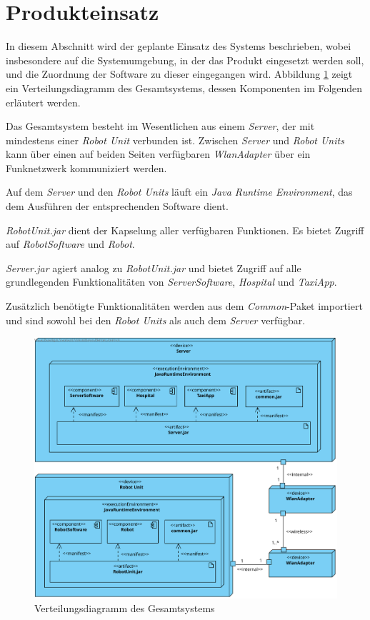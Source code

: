 \section{Produkteinsatz}

In diesem Abschnitt wird der geplante Einsatz des Systems beschrieben, wobei
insbesondere auf die Systemumgebung, in der das Produkt eingesetzt werden soll,
und die Zuordnung der Software zu dieser eingegangen wird.
Abbildung \ref{ProdukteinsatzKomp}
zeigt ein Verteilungsdiagramm des Gesamtsystems, dessen Komponenten im Folgenden
erläutert werden.

Das Gesamtsystem besteht im Wesentlichen aus einem \emph{Server}, der mit mindestens einer
\emph{Robot Unit} verbunden ist. Zwischen \emph{Server} und \emph{Robot Units} kann über
einen auf beiden Seiten verfügbaren \emph{Wlan\-Adapter} über ein
Funknetzwerk kommuniziert werden.

Auf dem \emph{Server} und den \emph{Robot Units} läuft ein \emph{Java Runtime Environment},
das dem Ausführen der entsprechenden Software dient.

\emph{RobotUnit.jar} dient der Kapselung aller verfügbaren Funktionen. Es bietet Zugriff
auf \emph{RobotSoftware} und \emph{Robot}.

\emph{Server.jar} agiert analog zu \emph{RobotUnit.jar} und bietet Zugriff auf alle grundlegenden 
Funktionalitäten von \emph{ServerSoftware}, \emph{Hospital} und \emph{TaxiApp}.

Zusätzlich benötigte Funktionalitäten werden aus dem \emph{Common}-Paket importiert und sind
sowohl bei den \emph{Robot Units} als auch dem \emph{Server} verfügbar.

\begin{figure}[H]
	\centering
	\includegraphics[width=1\textwidth]{img/2-Entwurf-9-Produkteinsatz}
	\caption{Verteilungsdiagramm des Gesamtsystems}
	\label{ProdukteinsatzKomp}
\end{figure}

